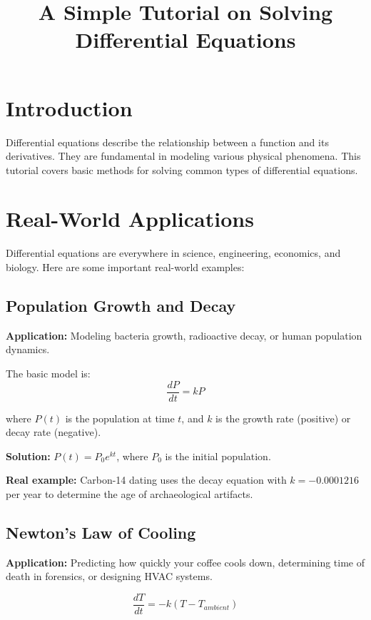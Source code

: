 \documentclass{article}
\title{A Simple Tutorial on Solving Differential Equations}
\author{}
\date{}
\begin{document}
\maketitle

\section{Introduction}

Differential equations describe the relationship between a function and its derivatives. They are fundamental in modeling various physical phenomena. This tutorial covers basic methods for solving common types of differential equations.

\section{Real-World Applications}

Differential equations are everywhere in science, engineering, economics, and biology. Here are some important real-world examples:

\subsection{Population Growth and Decay}

\textbf{Application:} Modeling bacteria growth, radioactive decay, or human population dynamics.

The basic model is:
\begin{equation}
\frac{dP}{dt} = kP
\end{equation}

where $P(t)$ is the population at time $t$, and $k$ is the growth rate (positive) or decay rate (negative).

\textbf{Solution:} $P(t) = P_0 e^{kt}$, where $P_0$ is the initial population.

\textbf{Real example:} Carbon-14 dating uses the decay equation with $k = -0.0001216$ per year to determine the age of archaeological artifacts.

\subsection{Newton's Law of Cooling}

\textbf{Application:} Predicting how quickly your coffee cools down, determining time of death in forensics, or designing HVAC systems.

\begin{equation}
\frac{dT}{dt} = -k(T - T_{ambient})
\end{equation}
\end{document}
